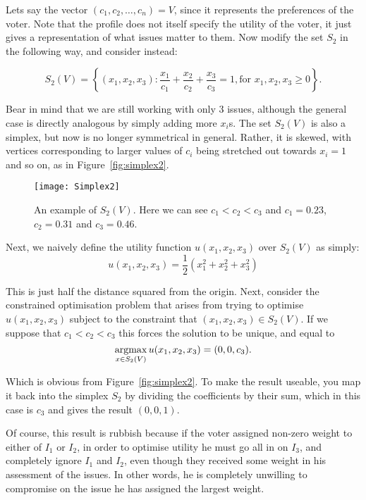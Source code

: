 \documentclass[
10pt, %
a4paper, %
oneside, %
headinclude,footinclude, %
BCOR5mm, %
]{scrartcl}
\theoremstyle{definition} %
\theoremstyle{plain} %
\theoremstyle{remark} %
\begin{document}
Lets say the vector $(c_1,c_2,\ldots,c_n) = V$, since it represents the preferences of the voter. Note that the profile does not itself specify the utility of the voter, it just gives a representation of what issues matter to them. Now modify the set $S_2$ in the following way, and consider instead:

$$S_2(V) = \left\{(x_1,x_2,x_3) \colon \frac{x_1}{c_1} + \frac{x_2}{c_2} + \frac{x_3}{c_3} = 1, \textrm{for } x_1,x_2,x_3 \geq 0\right\}.$$

Bear in mind that we are still working with only 3 issues, although the general case is directly analogous by simply adding more $x_i$s. The set $S_2(V)$ is also a simplex, but now is no longer symmetrical in general. Rather, it is skewed, with vertices corresponding to larger values of $c_i$ being stretched out towards $x_i = 1$ and so on, as in Figure~\vref{fig:simplex2}.

\begin{figure}[h]
\centering 
\texttt{[image: Simplex2]} 
\caption[Visualising $S_2(V)$]{An example of $S_2(V)$. Here we can see $c_1<c_2<c_3$ and $c_1 = 0.23$, $c_2 = 0.31$ and $c_3 = 0.46$.} %
\label{fig:simplex2} 
\end{figure}

Next, we naively define the utility function $u(x_1,x_2,x_3)$ over $S_2(V)$ as simply: $$u(x_1,x_2,x_3) = \frac{1}{2}(x_1^2 + x_2^2 + x_3^2)$$

This is just half the distance squared from the origin. Next, consider the constrained optimisation problem that arises from trying to optimise $u(x_1,x_2,x_3)$ subject to the constraint that $(x_1,x_2,x_3)\in S_2(V)$. If we suppose that $c_1< c_2 < c_3$ this forces the solution to be unique, and equal to $$\argmax_{x\in S_2(V)} u(x_1,x_2,x_3) = (0,0,c_3).$$

Which is obvious from Figure~\vref{fig:simplex2}. To make the result useable, you map it back into the simplex $S_2$ by dividing the coefficients by their sum, which in this case is $c_3$ and gives the result $(0,0,1)$.

Of course, this result is rubbish because if the voter assigned non-zero weight to either of $I_1$ or $I_2$, in order to optimise utility he must go all in on $I_3$, and completely ignore $I_1$ and $I_2$, even though they received some weight in his assessment of the issues. In other words, he is completely unwilling to compromise on the issue he has assigned the largest weight.
\end{document}
